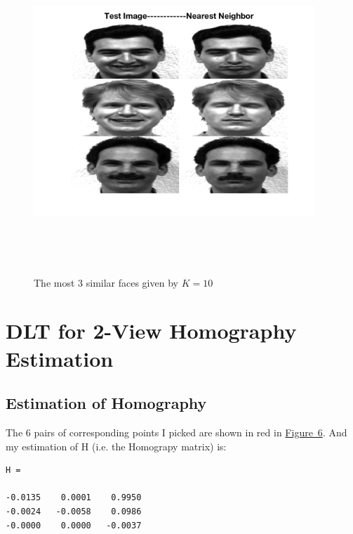 \documentclass{article}
\theoremstyle{plain} \newtheorem{prop}{Proposition}
\begin{document}
\begin{figure}
	\centering
	\includegraphics[width=300pt, height=345pt]{similar_faces_10.png}
	\caption{The most 3 similar faces given by $K=10$}
	\label{fig-5}
\end{figure}


\section{DLT for 2-View Homography Estimation}
\subsection{Estimation of Homography}
The 6 pairs of corresponding points I picked are shown in red in \hyperref[fig-6]{Figure~6}. And my estimation of H (i.e. the Homograpy matrix) is:
\begin{verbatim}
H =

-0.0135    0.0001    0.9950
-0.0024   -0.0058    0.0986
-0.0000    0.0000   -0.0037
\end{verbatim}
\end{document}
